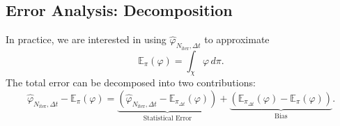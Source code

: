 \documentclass[11pt, twoside]{report}
\newtheorem{theorem}{Theorem}[section]
\begin{document}

\subsection{Error Analysis: Decomposition}

In practice, we are interested in using $\widehat{\varphi}_{N_{\text{iter}},\Delta t}$ to approximate
\[
\mathbb{E}_\pi(\varphi) = \int_\chi \varphi \, d\pi.
\]
The total error can be decomposed into two contributions:
\begin{equation} \label{eq:statistic_bias}
    \widehat{\varphi}_{N_{\text{iter}},\Delta t} - \mathbb{E}_\pi(\varphi) = \underbrace{\left( \widehat{\varphi}_{N_{\text{iter}},\Delta t} - \mathbb{E}_{\pi_{\Delta t}}(\varphi) \right)}_{\text{Statistical Error}} + \underbrace{\left( \mathbb{E}_{\pi_{\Delta t}}(\varphi) - \mathbb{E}_\pi(\varphi) \right)}_{\text{Bias}}.
\end{equation}
\end{document}
